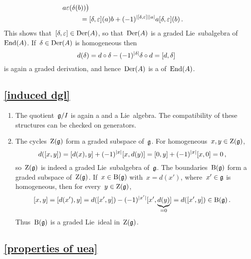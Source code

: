 \begin{enumerate}
\begin{align*}
            a \varepsilon(\delta(b))
        \bigr)
      \\
      ={}&
        [\delta, \varepsilon](a) b
      + (-1)^{\lvert[\delta, \varepsilon]\rvert \lvert a\rvert}
        a [\delta, \varepsilon](b) \,.
    \end{align*}
    \endgroup
    This shows that~$[\delta, \varepsilon] \in \operatorname{Der}(A)$, so that~$\operatorname{Der}(A)$ is a graded Lie~subalgebra of~$\operatorname{End}(A)$.
    If~$\delta \in \operatorname{Der}(A)$ is homogeneous then
    \[
      d(\delta)
      =
      d \circ \delta
      - (-1)^{\lvert\delta\rvert}
      \delta \circ d
      =
      [d, \delta]
    \]
    is again a graded derivation, and hence~$\operatorname{Der}(A)$ is a {\dgsub} of~$\operatorname{End}(A)$.
\end{enumerate}





\subsection{\cref{induced dgl}}
\label{induced dgl proof}

\begin{enumerate}
  \item
    The quotient~$\mathfrak{g}/I$ is again a {\dgvs} and a Lie~algebra.
    The compatibility of these structures can be checked on generators.
  \item
    The cycles~$\operatorname{Z}(\mathfrak{g})$ form a graded subspace of~$\mathfrak{g}$.
    For homogeneous~$x, y \in \operatorname{Z}(\mathfrak{g})$,
    \[
      d([x,y])
      =
      [d(x), y] + (-1)^{\lvert x\rvert} [x, d(y)]
      =
      [0, y] + (-1)^{\lvert x\rvert} [x, 0]
      =
      0 \,,
    \]
    so~$\operatorname{Z}(\mathfrak{g})$ is indeed a graded Lie~subalgebra of~$\mathfrak{g}$.
    The boundaries~$\operatorname{B}(\mathfrak{g})$ form a graded subspace of~$\operatorname{Z}(\mathfrak{g})$.
    If~$x \in \operatorname{B}(\mathfrak{g})$ with~$x = d(x')$, where~$x' \in \mathfrak{g}$ is homogeneous, then for every~$y \in \operatorname{Z}(\mathfrak{g})$,
    \[
      [x,y]
      =
      [d(x'), y]
      =
      d([x',y]) - (-1)^{\lvert x'\rvert} [x', \underbrace{d(y)}_{=0}]
      =
      d([x',y])
      \in
      \operatorname{B}(\mathfrak{g}) \,.
    \]
    Thus~$\operatorname{B}(\mathfrak{g})$ is a graded Lie~ideal in~$\operatorname{Z}(\mathfrak{g})$.
\end{enumerate}





\subsection{\cref{properties of uea}}
\label{properties of uea proof}

